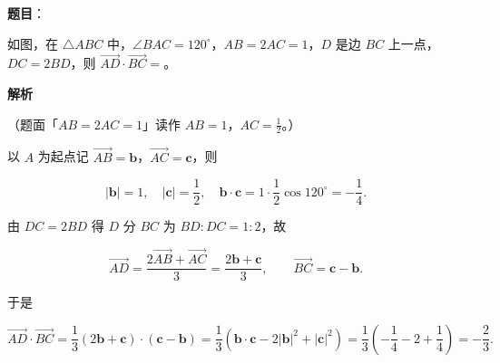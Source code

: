 \begin{answer}

\textbf{题目}：

如图，在 $\triangle ABC$ 中，$\angle BAC=120^\circ$，$AB=2AC=1$，$D$ 是边 $BC$ 上一点，$DC=2BD$，则 $\overrightarrow{AD}\cdot\overrightarrow{BC}=$\gkblank{}。
\nopagebreak[4]
\begin{center}\end{center}
\nopagebreak[4]
\textbf{解析}

（题面「$AB=2AC=1$」读作 $AB=1$，$AC=\frac12$。）

以 $A$ 为起点记 $\overrightarrow{AB}=\boldsymbol b$，$\overrightarrow{AC}=\boldsymbol c$，则

\nopagebreak[4]
\[|\boldsymbol b|=1,\quad|\boldsymbol c|=\frac12,\quad\boldsymbol b\cdot\boldsymbol c=1\cdot\frac12\cos120^\circ=-\frac14 .\]

由 $DC=2BD$ 得 $D$ 分 $BC$ 为 $BD:DC=1:2$，故

\nopagebreak[4]
\[\overrightarrow{AD}=\frac{2\overrightarrow{AB}+\overrightarrow{AC}}{3}=\frac{2\boldsymbol b+\boldsymbol c}{3},\qquad \overrightarrow{BC}=\boldsymbol c-\boldsymbol b .\]

于是

\nopagebreak[4]
\[\overrightarrow{AD}\cdot\overrightarrow{BC}=\frac13\left(2\boldsymbol b+\boldsymbol c\right)\cdot\left(\boldsymbol c-\boldsymbol b\right)
=\frac13\left(\boldsymbol b\cdot\boldsymbol c-2|\boldsymbol b|^2+|\boldsymbol c|^2\right)
=\frac13\left(-\frac14-2+\frac14\right)=-\frac23 .\]


\end{answer}
